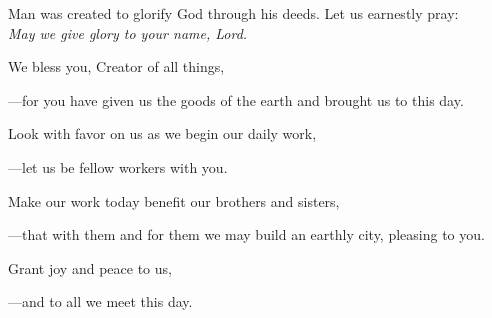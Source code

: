 \intercessions\indent

\begin{hangpar}

Man was created to glorify God through his deeds. Let us earnestly pray:\\
\emph{May we give glory to your name, Lord.}

\medskip We bless you, Creator of all things,

{\color{red}---\thinspace}for you have given us the goods of the earth and brought us to this day.

\medskip Look with favor on us as we begin our daily work,

{\color{red}---\thinspace}let us be fellow workers with you.

\medskip Make our work today benefit our brothers and sisters,

{\color{red}---\thinspace}that with them and for them we may build an earthly city, pleasing to you.

\medskip Grant joy and peace to us,

{\color{red}---\thinspace}and to all we meet this day.

\end{hangpar}

